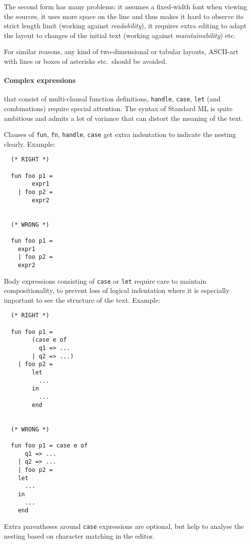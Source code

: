\begin{isabellebody}
\begin{isamarkuptext}
  The second form has many problems: it assumes a fixed-width font
  when viewing the sources, it uses more space on the line and thus
  makes it hard to observe its strict length limit (working against
  \emph{readability}), it requires extra editing to adapt the layout
  to changes of the initial text (working against
  \emph{maintainability}) etc.

  \medskip For similar reasons, any kind of two-dimensional or tabular
  layouts, ASCII-art with lines or boxes of asterisks etc.\ should be
  avoided.

  \paragraph{Complex expressions} that consist of multi-clausal
  function definitions, \verb|handle|, \verb|case|,
  \verb|let| (and combinations) require special attention.  The
  syntax of Standard ML is quite ambitious and admits a lot of
  variance that can distort the meaning of the text.

  Clauses of \verb|fun|, \verb|fn|, \verb|handle|,
  \verb|case| get extra indentation to indicate the nesting
  clearly.  Example:

  \begin{verbatim}
  (* RIGHT *)

  fun foo p1 =
        expr1
    | foo p2 =
        expr2


  (* WRONG *)

  fun foo p1 =
    expr1
    | foo p2 =
    expr2
  \end{verbatim}

  Body expressions consisting of \verb|case| or \verb|let|
  require care to maintain compositionality, to prevent loss of
  logical indentation where it is especially important to see the
  structure of the text.  Example:

  \begin{verbatim}
  (* RIGHT *)

  fun foo p1 =
        (case e of
          q1 => ...
        | q2 => ...)
    | foo p2 =
        let
          ...
        in
          ...
        end


  (* WRONG *)

  fun foo p1 = case e of
      q1 => ...
    | q2 => ...
    | foo p2 =
    let
      ...
    in
      ...
    end
  \end{verbatim}

  Extra parentheses around \verb|case| expressions are optional,
  but help to analyse the nesting based on character matching in the
  editor.


\end{isamarkuptext}
\end{isabellebody}
